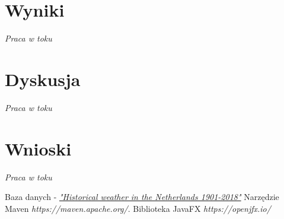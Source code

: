 \documentclass{classrep}
\begin{document}
\section{Wyniki}
\textit{Praca w toku}


\section{Dyskusja}
\textit{Praca w toku}


\section{Wnioski}
\textit{Praca w toku}


\begin{thebibliography}{2}
Baza danych - 
\href{https://www.kaggle.com/sinaasappel/historical-weather-in-the-netherlands-19012018}{\textit{"Historical weather in the Netherlands 1901-2018"}}
Narzędzie Maven\newline
\textit{https://maven.apache.org/}. 
Biblioteka JavaFX\newline
\textit{https://openjfx.io/}
\end{thebibliography}
\end{document}
